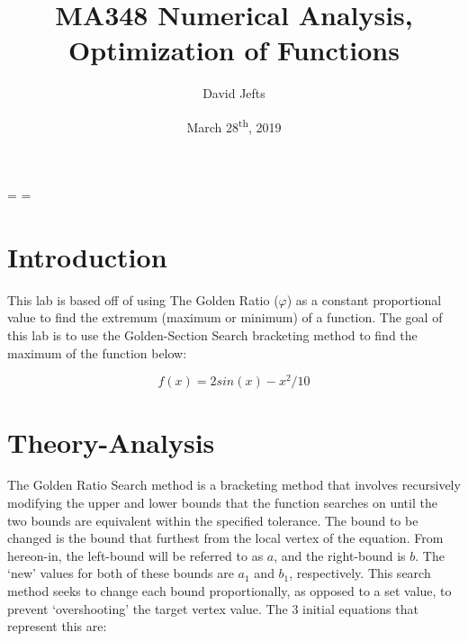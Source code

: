 \documentclass[12pt, letterpaper]{article}
\begin{document}
\setcounter{secnumdepth}{-1}
\binoppenalty=\maxdimen
\relpenalty=\maxdimen

\title{MA348 Numerical Analysis, Optimization of Functions}
\author{David Jefts}
\date{March 28\textsuperscript{th}, 2019}
\begin{titlepage}
	\centering
	\maketitle
	\centering
	\hfill
	\vfill
	\thispagestyle{empty}
\end{titlepage}

\setlength{\voffset}{-0.5in}
\setlength{\headsep}{10pt}

\section{\label{sec:intro}Introduction}
	This lab is based off of using The Golden Ratio ($\varphi$) as a constant proportional value to find the extremum (maximum or minimum) of a function. The goal of this lab is to use the Golden-Section Search bracketing method to find the maximum of the function below: 
	
	\begin{equation}{f(x)=2 sin(x)-x^2/10}\end{equation}

\section{\label{sesc:theory}Theory-Analysis}
	 The Golden Ratio Search method is a bracketing method that involves recursively modifying the upper and lower bounds that the function searches on until the two bounds are equivalent within the specified tolerance. The bound to be changed is the bound that furthest from the local vertex of the equation. From hereon-in, the left-bound will be referred to as $a$, and the right-bound is $b$. The `new' values for both of these bounds are $a_1$ and $b_1$, respectively. This search method seeks to change each bound proportionally, as opposed to a set value, to prevent `overshooting' the target vertex value. The 3 initial equations that represent this are: 
	 
\end{document}
